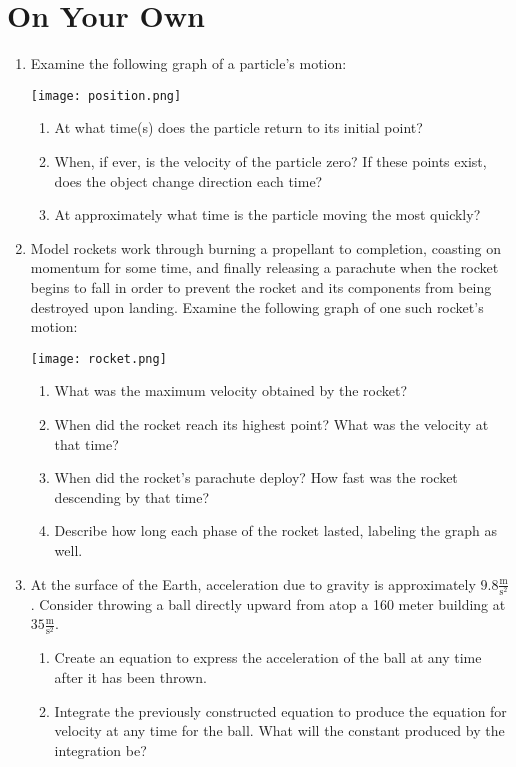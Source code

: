 \documentclass{ximera}
\begin{document}
\section{On Your Own}
\begin{enumerate}
\item{Examine the following graph of a particle's motion:}
\begin{image}
    \texttt{[image: position.png]}
\end{image}
\begin{enumerate}
\item{At what time(s) does the particle return to its initial point?}
\item{When, if ever, is the velocity of the particle zero? If these points exist, does the object change direction each time?}
\item{At approximately what time is the particle moving the most quickly?}
\end{enumerate}
\item{Model rockets work through burning a propellant to completion, coasting on momentum for some time, and finally releasing a parachute when the rocket begins to fall in order to prevent the rocket and its components from being destroyed upon landing. Examine the following graph of one such rocket's motion:}
\begin{image}
    \texttt{[image: rocket.png]}
\end{image}
\begin{enumerate}
\item{What was the maximum velocity obtained by the rocket?}
\item{When did the rocket reach its highest point? What was the velocity at that time?}
\item{When did the rocket's parachute deploy? How fast was the rocket descending by that time?}
\item{Describe how long each phase of the rocket lasted, labeling the graph as well.}
\end{enumerate}
\item{At the surface of the Earth, acceleration due to gravity is approximately $9.8 \frac{\text{m}}{\text{s}^2}$. Consider throwing a ball directly upward from atop a 160 meter building at $35 \frac{\text{m}}{\text{s}^2}$.}
\begin{enumerate}
\item{Create an equation to express the acceleration of the ball at any time after it has been thrown.}
\item{Integrate the previously constructed equation to produce the equation for velocity at any time for the ball. What will the constant produced by the integration be?}

\end{enumerate}
\end{enumerate}
\end{document}
